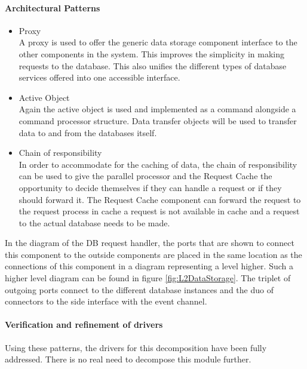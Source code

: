 \paragraph{Architectural Patterns}
\begin{itemize}
	\item{Proxy}\\
	A proxy is used to offer the generic data storage component interface to the other components in the system. This improves the simplicity in making requests to the database. This also unifies the different types of database services offered into one accessible interface.
	\item{Active Object}\\ 
	Again the active object is used and implemented as a command alongside a command processor structure. Data transfer objects will be used to transfer data to and from the databases itself.
	\item{Chain of responsibility}\\
	In order to accommodate for the caching of data, the chain of responsibility can be used to give the parallel processor and the Request Cache the opportunity to decide themselves if they can handle a request or if they should forward it. 
The Request Cache component can forward the request to the request process in cache a request is not available in cache and a request to the actual database needs to be made.
\end{itemize}
In the diagram of the DB request handler, the ports that are shown to connect this component to the outside components are placed in the same location as the connections of this component in a diagram representing a level higher. 
Such a higher level diagram can be found in figure \ref{fig:L2DataStorage}.
The triplet of outgoing ports connect to the different database instances and the duo of connectors to the side interface with the event channel.

\paragraph{Verification and refinement of drivers}
Using these patterns, the drivers for this decomposition have been fully addressed. There is no real need to decompose this module further.

